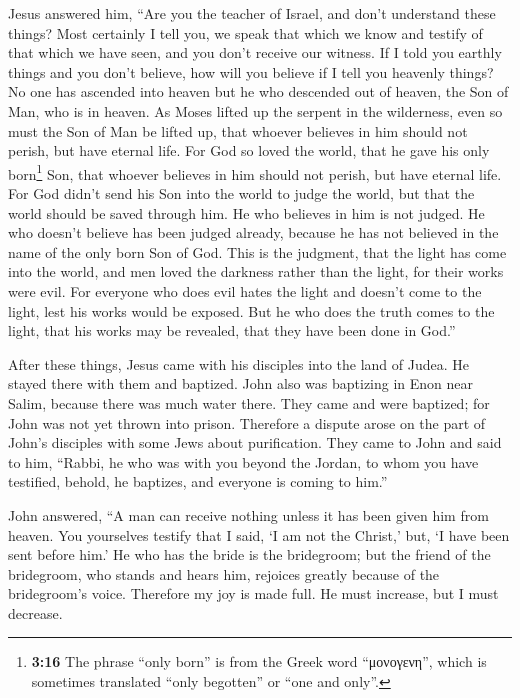  Jesus answered him, ``Are you the teacher of Israel, and
don't understand these things?  Most certainly I tell
you, we speak that which we know and testify of that which we have seen,
and you don't receive our witness.  If I told you earthly
things and you don't believe, how will you believe if I tell you
heavenly things?  No one has ascended into heaven but he
who descended out of heaven, the Son of Man, who is in heaven.
 As Moses lifted up the serpent in the wilderness, even
so must the Son of Man be lifted up,  that whoever
believes in him should not perish, but have eternal life.
 For God so loved the world, that he gave his only
born\footnote{\textbf{3:16} The phrase ``only born'' is from the Greek
  word ``μονογενη'', which is sometimes translated ``only begotten'' or
  ``one and only''.} Son, that whoever believes in him should not
perish, but have eternal life.  For God didn't send his
Son into the world to judge the world, but that the world should be
saved through him.  He who believes in him is not judged.
He who doesn't believe has been judged already, because he has not
believed in the name of the only born Son of God.  This
is the judgment, that the light has come into the world, and men loved
the darkness rather than the light, for their works were evil.
 For everyone who does evil hates the light and doesn't
come to the light, lest his works would be exposed.  But
he who does the truth comes to the light, that his works may be
revealed, that they have been done in God.''

 After these things, Jesus came with his disciples into
the land of Judea. He stayed there with them and baptized.
 John also was baptizing in Enon near Salim, because
there was much water there. They came and were baptized; 
for John was not yet thrown into prison.  Therefore a
dispute arose on the part of John's disciples with some Jews about
purification.  They came to John and said to him,
``Rabbi, he who was with you beyond the Jordan, to whom you have
testified, behold, he baptizes, and everyone is coming to him.''

 John answered, ``A man can receive nothing unless it has
been given him from heaven.  You yourselves testify that
I said, `I am not the Christ,' but, `I have been sent before him.'
 He who has the bride is the bridegroom; but the friend
of the bridegroom, who stands and hears him, rejoices greatly because of
the bridegroom's voice. Therefore my joy is made full. 
He must increase, but I must decrease.

